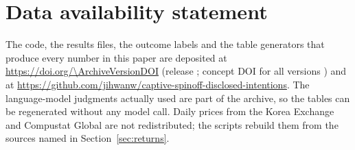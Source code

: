\section*{Data availability statement}
The code, the results files, the outcome labels and the table generators that produce every number in this paper are deposited at \url{https://doi.org/\ArchiveVersionDOI} (release \ArchiveTag; concept DOI for all versions \ArchiveConceptDOI) and at \url{https://github.com/jihwanw/captive-spinoff-disclosed-intentions}. The language-model judgments actually used are part of the archive, so the tables can be regenerated without any model call. Daily prices from the Korea Exchange and Compustat Global are not redistributed; the scripts rebuild them from the sources named in Section~\ref{sec:returns}.
